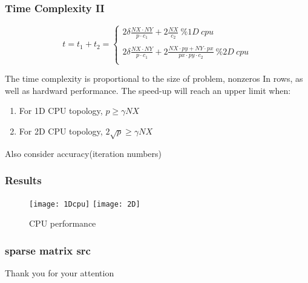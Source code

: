 \documentclass[mathserif]{beamer}
\begin{document}
\begin{frame}
\frametitle{Time Complexity II}

	\[
	 t = t_1 + t_2 = \left \{
				 \begin{array}{ll}
				 2\delta \frac{NX \cdot NY}{ p \cdot c_1} + 2 \frac{NX}{c_2}  \  \% 1D \ cpu	\\
				\\
				 2\delta \frac{NX \cdot NY}{ p \cdot c_1} + 2 \frac{NX \cdot py + NY \cdot px}{px \cdot py \cdot c_2}  \ \% 2D \  cpu	\\

				  \end{array}		 
			\right.
	  \]

	The time complexity is proportional to the size of problem, nonzeros In rows, as well as hardward performance. The speed-up will reach an upper limit when:
	\begin{enumerate}
	\item{For 1D CPU topology, $p \geq \gamma  NX$ }
	\item{For 2D CPU topology,  $ 2\sqrt{p} \geq \gamma NX$ }
	\end{enumerate}

	Also consider accuracy(iteration numbers)	

\end{frame}

\begin{frame}
\frametitle{Results}
\begin{figure}[h!]
\centerline
{
	\texttt{[image: 1Dcpu]}
	\texttt{[image: 2D]}
}
\caption{CPU performance}
\end{figure}
\end{frame}

\begin{frame}
\frametitle{sparse matrix src}
\tiny
	
\end{frame}

\begin{frame}
	\begin{Huge} Thank you for your attention \end{Huge}	


\end{frame}
\end{document}
